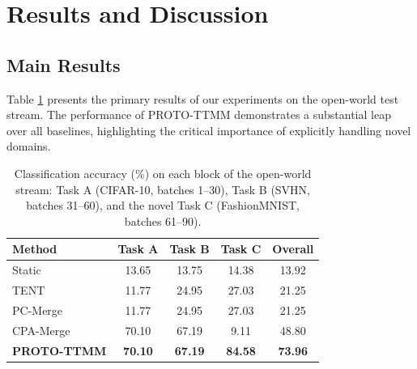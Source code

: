 \documentclass[twoside]{article}
\begin{document}
\section{Results and Discussion}
\label{sec:results}

\subsection{Main Results}

Table \ref{tab:main_results} presents the primary results of our experiments on the open-world test stream. The performance of PROTO-TTMM demonstrates a substantial leap over all baselines, highlighting the critical importance of explicitly handling novel domains.

\begin{table}[h]
\caption{Classification accuracy (\%) on each block of the open-world stream: Task A (CIFAR-10, batches 1--30), Task B (SVHN, batches 31--60), and the novel Task C (FashionMNIST, batches 61--90).}
\label{tab:main_results}
\vskip 0.15in
\begin{center}
\begin{small}
\begin{sc}
\setlength{\tabcolsep}{3.5pt}
\begin{tabular}{lcccc}
\toprule
Method & Task A & Task B & Task C & Overall \\
\midrule
Static & 13.65 & 13.75 & 14.38 & 13.92 \\
TENT & 11.77 & 24.95 & 27.03 & 21.25 \\
PC-Merge & 11.77 & 24.95 & 27.03 & 21.25 \\
CPA-Merge & 70.10 & 67.19 & 9.11 & 48.80 \\
\midrule
\textbf{PROTO-TTMM} & \textbf{70.10} & \textbf{67.19} & \textbf{84.58} & \textbf{73.96} \\
\bottomrule
\end{tabular}
\end{sc}
\end{small}
\end{center}
\vskip -0.1in
\end{table}
\end{document}
